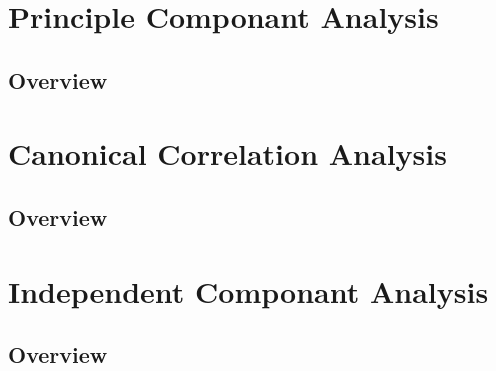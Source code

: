 \documentclass[11pt,fleqn]{book} %
\begin{document}

\chapter{Principle Componant Analysis}

\section{Overview}



\chapter{Canonical Correlation Analysis}

\section{Overview}



\chapter{Independent Componant Analysis}

\section{Overview}



\end{document}
